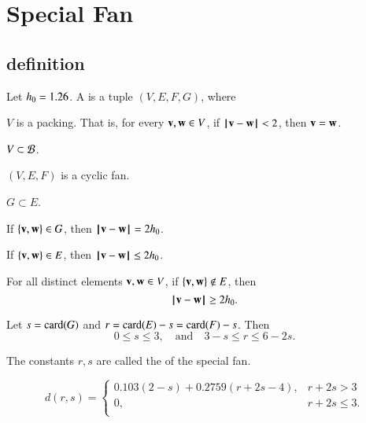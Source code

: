 \section{Special Fan}\label{sec:weight}  






\subsection{definition}

\begin{definition}
Let $\hm = 1.26$.
A  is a tuple $(V,E,F,G)$, where
\begin{nomerate}
\item {} $V$ is a packing.  That is, for every $\v,\w\in V$, if $\norm{\v}{\w}<2$, then $\v=\w$.
\item {} $V\subset \BB$.
\item {} $(V,E,F)$ is a cyclic fan.
\item {} $G\subset E$.
\item {} If $\{\v,\w\}\in G$, then $\norm{\v}{\w}=2\hm$.
\item {} If $\{\v,\w\}\in E$, then $\norm{\v}{\w}\le 2\hm$.
\item {} For all distinct elements $\v,\w\in V$, if
$\{\v,\w\}\not\in E$, then $$\norm{\v}{\w}\ge 2\hm.$$
\item {} %
 Let      $s=\card(G)$ and $r=\card(E) - s = \card(F)-s$.  Then
$$0\le s \le 3,\quad\text{and}\quad3-s \le r \le 6 - 2s.$$
\end{nomerate}
The constants $r,s$ are called the  of the special fan.
\end{definition}


\begin{definition}[d]
$$d(r,s) = \begin{cases}
    0.103 (2-s) + 0.2759 (r+2s-4), & r + 2s > 3\\
    0, & r + 2s \le 3.\\
    \end{cases}$$
\end{definition}

